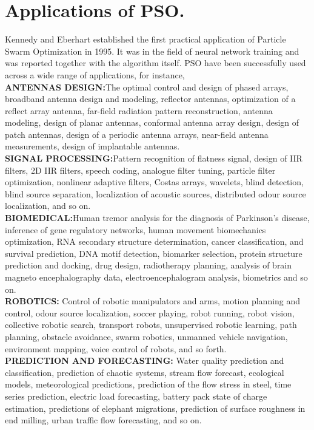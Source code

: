 \section{Applications of PSO.}Kennedy and Eberhart established the first practical application of Particle Swarm Optimization in 1995. It was in the field of neural network training and was reported together with the algorithm itself. PSO have been successfully used across a wide range of applications, for instance,\\
\textbf{ANTENNAS DESIGN:}The optimal control and design of phased arrays, broadband antenna design and modeling, reflector antennas, optimization of a reflect array antenna, far-field radiation pattern reconstruction, antenna modeling, design of planar antennas, conformal antenna array design, design of patch antennas, design of a periodic antenna arrays, near-field antenna measurements, design of implantable antennas. \\
\textbf{SIGNAL PROCESSING:}Pattern recognition of flatness signal, design of IIR filters, 2D IIR filters, speech coding, analogue filter tuning, particle filter optimization, nonlinear adaptive filters, Costas arrays, wavelets, blind detection, blind source separation, localization of acoustic sources, distributed odour source localization, and so on.\\
\textbf{BIOMEDICAL:}Human tremor analysis for the diagnosis of Parkinson’s disease, inference of gene regulatory networks, human movement biomechanics optimization, RNA secondary structure determination, cancer classification, and survival prediction, DNA motif detection, biomarker selection, protein structure prediction and docking, drug design, radiotherapy planning, analysis of brain magneto encephalography data, electroencephalogram analysis, biometrics and so on.\\
\textbf{ROBOTICS:} Control of robotic manipulators and arms, motion planning and control, odour source localization, soccer playing, robot running, robot vision, collective robotic search, transport robots, unsupervised robotic learning, path planning, obstacle avoidance, swarm robotics, unmanned vehicle navigation, environment mapping, voice control of robots, and so forth.\\
\textbf{PREDICTION AND FORECASTING:} Water quality prediction and classification, prediction of chaotic systems, stream flow forecast, ecological models, meteorological predictions, prediction of the flow stress in steel, time series prediction, electric load forecasting, battery pack state of charge estimation, predictions of elephant migrations, prediction of surface roughness in end milling, urban traffic flow forecasting, and so on.\\


